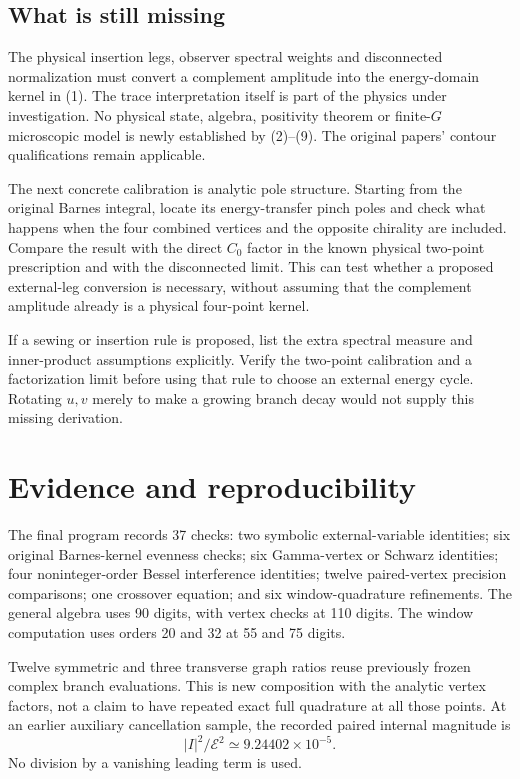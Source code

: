 \documentclass[11pt,a4paper]{article}
\newcommand{\E}{\mathcal E}
\begin{document}
\subsection*{What is still missing}
The physical insertion legs, observer spectral weights and disconnected
normalization must convert a complement amplitude into the
energy-domain kernel in (1).
The trace interpretation itself is part of the physics under
investigation. No physical state, algebra, positivity theorem or
finite-\(G\) microscopic model is newly established by (2)--(9).
The original papers' contour qualifications remain applicable.

The next concrete calibration is analytic pole structure.
Starting from the original Barnes integral, locate its
energy-transfer pinch poles and check what happens when the four
combined vertices and the opposite chirality are included.
Compare the result with the direct \(C_0\) factor in the known physical
two-point prescription and with the disconnected limit.
This can test whether a proposed external-leg conversion is necessary,
without assuming that the complement amplitude already is a physical
four-point kernel.

If a sewing or insertion rule is proposed, list the extra spectral
measure and inner-product assumptions explicitly. Verify the
two-point calibration and a factorization limit before using that
rule to choose an external energy cycle. Rotating \(u,v\) merely to
make a growing branch decay would not supply this missing derivation.

\newpage
\section{Evidence and reproducibility}
The final program records 37 checks:
two symbolic external-variable identities; six original Barnes-kernel
evenness checks; six Gamma-vertex or Schwarz identities;
four noninteger-order Bessel interference identities;
twelve paired-vertex precision comparisons; one crossover equation;
and six window-quadrature refinements.
The general algebra uses 90 digits, with vertex checks at 110 digits.
The window computation uses orders 20 and 32 at 55 and 75 digits.

Twelve symmetric and three transverse graph ratios reuse previously
frozen complex branch evaluations. This is new composition with the
analytic vertex factors, not a claim to have repeated exact full
quadrature at all those points.
At an earlier auxiliary cancellation sample,
the recorded paired internal magnitude is
\[
 |I|^2/\E^2\simeq9.24402\times10^{-5}.
\]
No division by a vanishing leading term is used.
\end{document}
